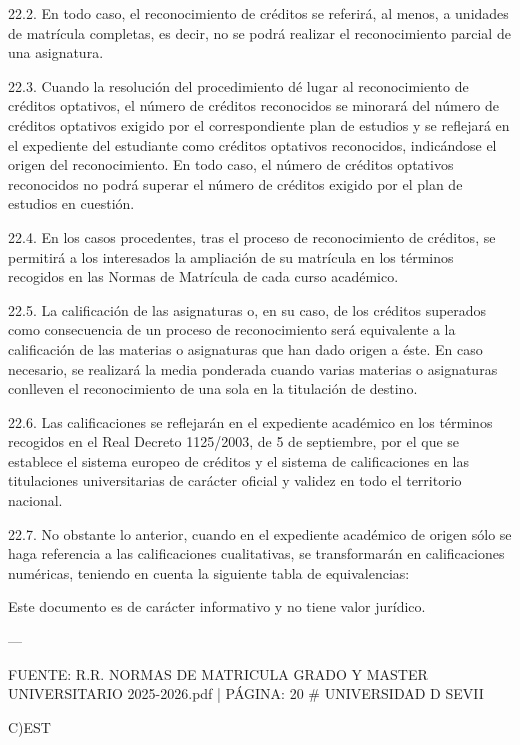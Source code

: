 \documentclass{article}
\begin{document}
\begin{itemize}
\begin{itemize}
\begin{scriptsize}
                  22.2. En todo caso, el reconocimiento de créditos se referirá, al menos, a unidades de matrícula completas, es decir, no se podrá realizar el reconocimiento parcial de una asignatura.

                  22.3. Cuando la resolución del procedimiento dé lugar al reconocimiento de créditos optativos, el número de créditos reconocidos se minorará del número de créditos optativos exigido por el correspondiente plan de estudios y se reflejará en el expediente del estudiante como créditos optativos reconocidos, indicándose el origen del reconocimiento. En todo caso, el número de créditos optativos reconocidos no podrá superar el número de créditos exigido por el plan de estudios en cuestión.

                  22.4. En los casos procedentes, tras el proceso de reconocimiento de créditos, se permitirá a los interesados la ampliación de su matrícula en los términos recogidos en las Normas de Matrícula de cada curso académico.

                  22.5. La calificación de las asignaturas o, en su caso, de los créditos superados como consecuencia de un proceso de reconocimiento será equivalente a la calificación de las materias o asignaturas que han dado origen a éste. En caso necesario, se realizará la media ponderada cuando varias materias o asignaturas conlleven el reconocimiento de una sola en la titulación de destino.

                  22.6. Las calificaciones se reflejarán en el expediente académico en los términos recogidos en el Real Decreto 1125/2003, de 5 de septiembre, por el que se establece el sistema europeo de créditos y el sistema de calificaciones en las titulaciones universitarias de carácter oficial y validez en todo el territorio nacional.

                  22.7. No obstante lo anterior, cuando en el expediente académico de origen sólo se haga referencia a las calificaciones cualitativas, se transformarán en calificaciones numéricas, teniendo en cuenta la siguiente tabla de equivalencias:

                  Este documento es de carácter informativo y no tiene valor jurídico.

                  ---

                  FUENTE: R.R. NORMAS DE MATRICULA GRADO Y MASTER UNIVERSITARIO 2025-2026.pdf | PÁGINA: 20
                  \# UNIVERSIDAD D SEVII

                  C)EST


\end{scriptsize}
\end{itemize}
\end{itemize}
\end{document}

